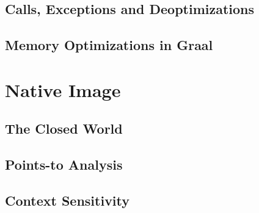 \subsection{Calls, Exceptions and Deoptimizations}
\subsection{Memory Optimizations in Graal}

\section{Native Image}
\subsection{The Closed World}
\subsection{Points-to Analysis}
\subsection{Context Sensitivity}
